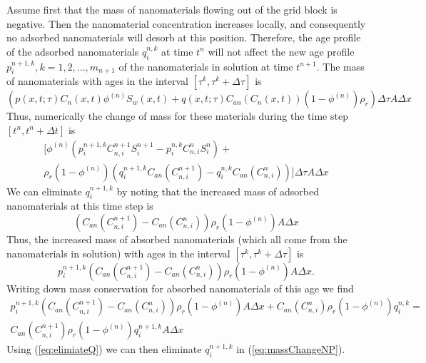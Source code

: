 \documentclass[energies,article,submit,moreauthors,pdftex]{Definitions/mdpi}
\begin{document}
Assume first that the mass of nanomaterials flowing out of the grid block is negative. Then the nanomaterial concentration increases locally, and consequently no adsorbed nanomaterials will desorb at this position. Therefore, the age profile of the adsorbed nanomaterials $q_i^{n,k}$ at time $t^n$ will not affect the new age profile  $p_i^{n+1,k},k=1,2,...,m_{n+1}$ of the nanomaterials in solution at time  $t^{n+1}$. The mass of nanomaterials with ages in the interval $\left[\tau^k, \tau^k+\Delta\tau\right]$ is
\begin{equation*}
    \left(p(x,t;\tau)C_n(x,t)\phi^{(n)}S_w(x,t) + q(x,t;\tau)C_{an}(C_n(x,t))(1-\phi^{(n)})\rho_r\right) \Delta\tau A\Delta x
\end{equation*}
Thus, numerically the change of mass for these materials during the time step $\left[t^n, t^n+\Delta t\right]$ is
\begin{multline} \label{eq:massChangeNP} %
    \bigg[\phi^{(n)}\left(p_i^{n+1,k}C_{n,i}^{n+1}S_i^{n+1}- p_{i}^{n,k}C_{n,i}^{n}S_{i}^{n}\right) +\\ \rho_r(1-\phi^{(n)}) \left(q_i^{n+1,k}C_{an}(C_{n,i}^{n+1})- q_{i}^{n,k}C_{an}(C_{n,i}^{n})\right)\bigg]
    \Delta\tau A\Delta x
\end{multline}
We can eliminate $q_{i}^{n+1,k}$ by noting that the increased mass of adsorbed nanomaterials at this time step is
\begin{equation*}
    \left(C_{an}(C_{n,i}^{n+1})- C_{an}(C_{n,i}^{n})\right)
    \rho_r\left(1-\phi^{(n)}\right) A\Delta x
\end{equation*}
Thus, the increased mass of absorbed nanomaterials (which all come from the nanomaterials in solution) with ages in the interval $\left[\tau^k, \tau^k+\Delta\tau\right]$ is
\begin{equation*}
    p_i^{n+1,k}\left(C_{an}(C_{n,i}^{n+1})- C_{an}(C_{n,i}^{n})\right)
    \rho_r\left(1-\phi^{(n)}\right) A\Delta x.
\end{equation*}
Writing down mass conservation for absorbed nanomaterials of this age we find
\begin{multline} \label{eq:elimiateQ} %
    p_i^{n+1,k}\left(C_{an}(C_{n,i}^{n+1})- C_{an}(C_{n,i}^{n})\right)
    \rho_r\left(1-\phi^{(n)}\right) A\Delta x +
    C_{an}(C_{n,i}^{n})\rho_r\left(1-\phi^{(n)}\right)q_i^{n,k} = \\
    C_{an}(C_{n,i}^{n+1})\rho_r\left(1-\phi^{(n)}\right)q_i^{n+1,k}A\Delta x 
\end{multline}
Using (\ref{eq:elimiateQ}) we can then eliminate $q_i^{n+1,k}$ in (\ref{eq:massChangeNP}). 
\end{document}
